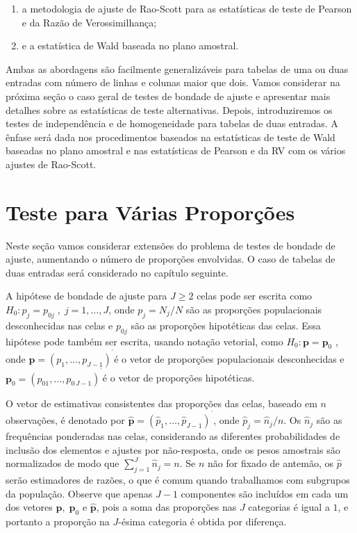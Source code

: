 \documentclass[]{book}
\numberwithin{example}{chapter}
\numberwithin{remark}{chapter}
\numberwithin{definition}{chapter}
\begin{document}
\begin{enumerate}
\def\labelenumi{\arabic{enumi}.}
\item
  a metodologia de ajuste de Rao-Scott para as estatísticas de teste de
  Pearson e da Razão de Verossimilhança;
\item
  e a estatística de Wald baseada no plano amostral.
\end{enumerate}

Ambas as abordagens são facilmente generalizáveis para tabelas de uma ou
duas entradas com número de linhas e colunas maior que dois. Vamos
considerar na próxima seção o caso geral de testes de bondade de ajuste
e apresentar mais detalhes sobre as estatísticas de teste alternativas.
Depois, introduziremos os testes de independência e de homogeneidade
para tabelas de duas entradas. A ênfase será dada nos procedimentos
baseados na estatísticas de teste de Wald baseadas no plano amostral e
nas estatísticas de Pearson e da RV com os vários ajustes de Rao-Scott.

\section{Teste para Várias
Proporções}\label{teste-para-varias-proporcoes}

Neste seção vamos considerar extensões do problema de testes de bondade
de ajuste, aumentando o número de proporções envolvidas. O caso de
tabelas de duas entradas será considerado no capítulo seguinte.

A hipótese de bondade de ajuste para \(J\geq 2\) celas pode ser escrita
como \(H_{0}:p_{j}=p_{0j}\;,\;j=1,\ldots ,J\), onde \(p_{j}=N_{j}/N\)
são as proporções populacionais desconhecidas nas celas e \(p_{0j}\) são
as proporções hipotéticas das celas. Essa hipótese pode também ser
escrita, usando notação vetorial, como \(H_{0}:\mathbf{p=p}_{0}\) , onde
\(\mathbf{p=}\left( p_{1},\ldots ,p_{J-1}\right) ^{^{\prime}}\)é o vetor
de proporções populacionais desconhecidas e
\(\mathbf{p}_{0}\mathbf{=}\left( p_{01},\ldots ,p_{0\,J-1}\right) ^{^{\prime}}\)é
o vetor de proporções hipotéticas.

O vetor de estimativas consistentes das proporções das celas, baseado em
\(n\) observações, é denotado por
\(\widehat{\mathbf{p}}\mathbf{=}\left(\widehat{p}_{1},\ldots,\widehat{p}_{J-1}\right) ^{^{\prime}}\),
onde \(\widehat{p}_{j}=\widehat{n}_{j}/n\). Os \(\widehat{n}_{j}\) são
as frequências ponderadas nas celas, considerando as diferentes
probabilidades de inclusão dos elementos e ajustes por não-resposta,
onde os pesos amostrais são normalizados de modo que
\(\sum_{j=1}^{J}\widehat{n}_{j}=n\). Se \(n\) não for fixado de antemão,
os \(\widehat{p}\) serão estimadores de razões, o que é comum quando
trabalhamos com subgrupos da população. Observe que apenas \(J-1\)
componentes são incluídos em cada um dos vetores \(\mathbf{p,\;p}_{0}\)
e \(\widehat{\mathbf{p}}\), pois a soma das proporções nas \(J\)
categorias é igual a \(1\), e portanto a proporção na \(J\)-ésima
categoria é obtida por diferença.
\end{document}
